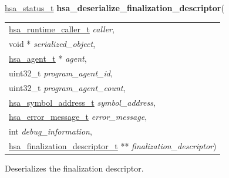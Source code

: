 \documentclass[final]{book}
\newcommand{\hsaarg}[1]{\textit{#1}}
\begin{document}
\begin{appendices}
\noindent\begin{tcolorbox}[breakable,nobeforeafter,colframe=white,colback=lightgray,left=0mm]
\hyperlink{group--status-1gad755322e7ff95456520e8abdbe90d225}{hsa_status_t} \hypertarget{group--FinalizerCoreApi-1ga42e486beaee4b24ac23a650386423bb4}{\textbf{hsa_deserialize_finalization_descriptor}}(
\vspace{-3.5mm}\begin{longtable}{@{}p{\textwidth}}
\hspace{1.7em}\hyperlink{group--RuntimeCommon-1ga7d9b1191602415f5dd3893985cc93826}{hsa_runtime_caller_t} \hsaarg{caller},\\
\hspace{1.7em}void * \hsaarg{serialized_object},\\
\hspace{1.7em}\hyperlink{group--topology-1gab8db3fb886332a24acac08ec361e1d86}{hsa_agent_t} * \hsaarg{agent},\\
\hspace{1.7em}uint32_t \hsaarg{program_agent_id},\\
\hspace{1.7em}uint32_t \hsaarg{program_agent_count},\\
\hspace{1.7em}\hyperlink{group--FinalizerCoreApi-1ga47a961031477ca43f4fee297ae0d6dc1}{hsa_symbol_address_t} \hsaarg{symbol_address},\\
\hspace{1.7em}\hyperlink{group--FinalizerCoreApi-1ga0105dcb4254850e0ec03d44fc54e11b8}{hsa_error_message_t} \hsaarg{error_message},\\
\hspace{1.7em}int \hsaarg{debug_information},\\
\hspace{1.7em}\hyperlink{group--FinalizerCoreApi-1ga1f7f93c63b221fc5f3e0e16c615f7c05}{hsa_finalization_descriptor_t} ** \hsaarg{finalization_descriptor})\end{longtable}

\end{tcolorbox}
Deserializes the finalization descriptor.


\end{appendices}
\end{document}
